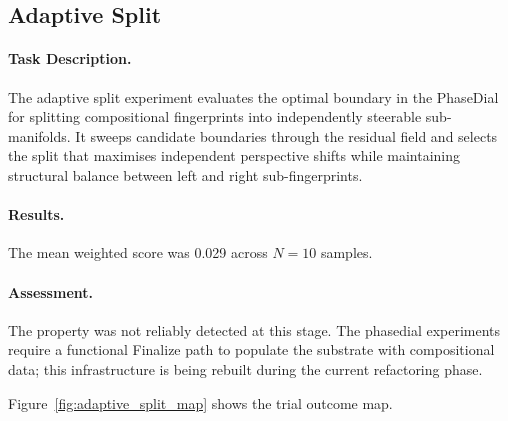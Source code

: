 \subsection{Adaptive Split}
\label{sec:adaptive_split}

\paragraph{Task Description.}
The adaptive split experiment evaluates the optimal boundary in the PhaseDial for splitting
compositional fingerprints into independently steerable sub-manifolds.
It sweeps candidate boundaries through the residual field and selects
the split that maximises independent perspective shifts while maintaining
structural balance between left and right sub-fingerprints.

\paragraph{Results.}
The mean weighted score was 0.029 across $N = 10$ samples.

\paragraph{Assessment.}
The property was not reliably detected at this stage.  The phasedial
experiments require a functional Finalize path to populate the substrate
with compositional data; this infrastructure is being rebuilt during
the current refactoring phase.

Figure~\ref{fig:adaptive_split_map} shows the trial outcome map.
